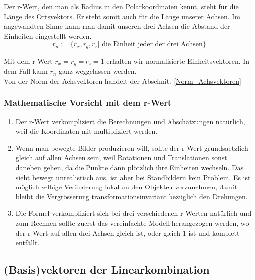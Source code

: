 \documentclass[a4paper]{article}
\begin{document}
Der r-Wert, den man als Radius in den Polarkoordinaten kennt, steht f\"ur die L\"ange des Ortsvektors. Er steht somit auch f\"ur die L\"ange unserer Achsen. Im angewandten Sinne kann man damit unseren drei Achsen die Abstand der Einheiten eingestellt werden.\\


\begin{displaymath}
	r_n := \{ r_x , r_y , r_z | \mbox{ die Einheit jeder der drei Achsen}\}
\end{displaymath}

Mit dem r-Wert $r_x = r_y = r_z = 1$ erhalten wir normalisierte Einheitsvektoren. In dem Fall kann $r_n$ ganz weggelassen werden.\\

Von der Norm der Achsvektoren handelt der Abschnitt \ref{Norm_Achsvektoren}


\subsubsection{Mathematische Vorsicht mit dem r-Wert}

\begin{enumerate}

\item Der r-Wert verkompliziert die Berechnungen und Absch\"atzungen nat\"urlich, weil die Koordinaten mit multipliziert werden. \\

\item Wenn man bewegte Bilder produzieren will, sollte der r-Wert grundsaetzlich gleich auf allen Achsen sein, weil Rotationen und Translationen sonst daneben gehen, da die Punkte dann pl\"otzlich ihre Einheiten wechseln. Das sieht bewegt unrealistisch aus, ist aber
bei Standbildern kein Problem. Es ist m\"oglich selbige Ver\"anderung lokal an den Objekten vorzunehmen, damit bleibt die Vergr\"osserung transformationsinvariant bez\"uglich den Drehungen.\\

\item Die Formel verkompliziert sich bei drei verschiedenen r-Werten nat\"urlich und zum Rechnen sollte zuerst das vereinfachte Modell
herangezogen werden, wo der r-Wert auf allen drei Achsen gleich ist, oder gleich $1$ ist und komplett entf\"allt.\\

\end{enumerate}

\subsection{(Basis)vektoren der Linearkombination}
\end{document}

